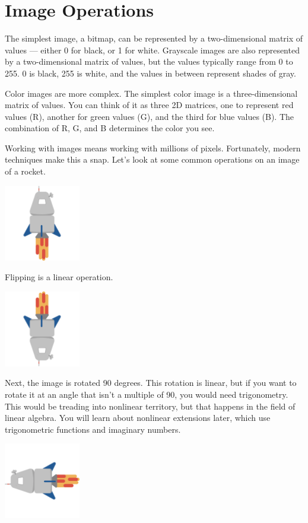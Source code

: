 \section{Image Operations}
The simplest image, a bitmap, can be represented by a two-dimensional matrix 
of values --- either 0 for black, or 1 for white. Grayscale images are also 
represented by a two-dimensional matrix of values, but the values typically 
range from 0 to 255. 0 is black, 255 is white, and the values in between 
represent shades of gray. 

Color images are more complex. The simplest color image is a three-dimensional 
matrix of values. You can think of it as three 2D matrices, one to represent 
red values (R), another for green values (G), and the third for blue values 
(B). The combination of R, G, and B determines the color you see.

Working with images means working with millions of pixels. Fortunately, 
modern techniques make this a snap. Let's look at some common operations on an 
image of a rocket.

\includegraphics[width=0.25\textwidth]{flying-rocket.png}

Flipping is a linear operation.

\includegraphics[width=0.25\textwidth]{rocket-flipped.png}

Next, the image is rotated 90 degrees. This rotation is linear, but if you 
want to rotate it at an angle that isn't a multiple of 90, you would need 
trigonometry. This would be treading into nonlinear territory, but that happens 
in the field of linear algebra. You will learn about nonlinear extensions 
later, which use trigonometric functions and imaginary numbers.

\includegraphics[width=0.25\textwidth]{rocket-rotated-90.png}

